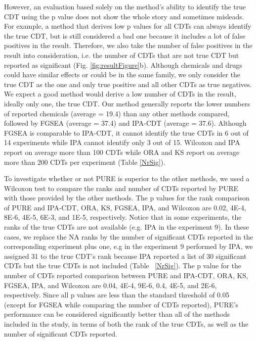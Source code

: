 \documentclass[Minh_PhD_thesis.tex]{subfiles}
\begin{document}
However, an evaluation based solely on the method's ability to identify the true CDT using the p value does not show the whole story and sometimes misleads.
For example, a method that derives low p values for all CDTs can always identify the true CDT, but is still considered a bad one because it includes a lot of false positives in the result.
Therefore, we also take the number of false positives in the result into consideration, i.e. the number of CDTs that are not true CDT but reported as significant (Fig. \ref{fig:resultFigure}b).
Although chemicals and drugs could have similar effects or could be in the same family, we only consider the true CDT as the one and only true positive and all other CDTs as true negatives.
We expect a good method would derive a low number of CDTs in the result, ideally only one, the true CDT.
Our method generally reports the lower numbers of reported chemicals (average = 19.4) than any other methods compared, followed by FGSEA (average = 37.4) and IPA-CDT (average = 37.6).
Although FGSEA is comparable to IPA-CDT, it cannot identify the true CDTs in 6 out of 14 experiments while IPA  cannot identify only 3 out of 15.
Wilcoxon and IPA report on average more than 100 CDTs while ORA and KS report on average more than 200 CDTs per experiment (Table \ref{NrSig}).

To investigate whether or not  PURE is superior to the other methods, we used a Wilcoxon test to compare the ranks and number of CDTs reported by PURE with those provided by the  other methods. The p values for the rank comparison of PURE and IPA-CDT, ORA, KS, FGSEA, IPA, and Wilcoxon are 0.02, 4E-4, 8E-6, 4E-5, 6E-3, and 1E-5, respectively. Notice that in some experiments, the ranks of the true CDTs are not available (e.g. IPA in the experiment 9). In these cases, we replace the NA ranks by the number of significant CDTs reported in the corresponding experiment plus one, e.g in the experiment 9 performed by IPA, we assigned 31 to the true CDT's rank because IPA reported a list of 30 significant CDTs but the true CDTs is not included (Table ~\ref{NrSig}). The p value for the number of CDTs reported comparison between PURE and IPA-CDT, ORA, KS,  FGSEA, IPA, and Wilcoxon are 0.04, 4E-4, 9E-6, 0.4, 4E-5, and 2E-6, respectively. Since all  p values are less than the standard threshold of 0.05 (except for FGSEA while comparing the number of CDTs reported), PURE's performance can be considered significantly better than all of the methods included in the study, in terms of both the rank of the true CDTs, as well as the number of significant CDTs reported.
\end{document}
